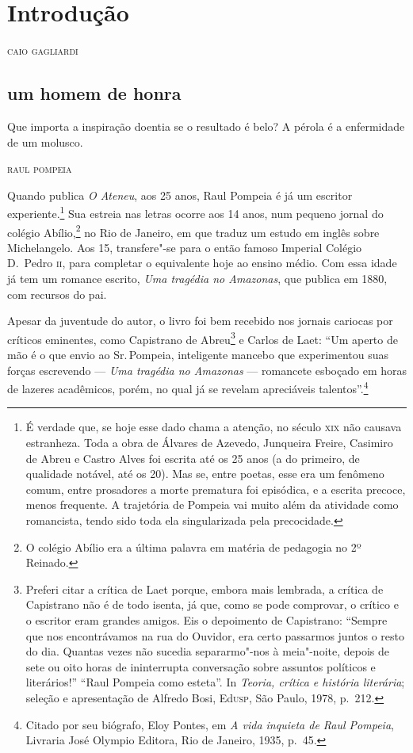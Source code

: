 \chapter[Introdução, \emph{por Caio Gagliardi}]{Introdução}

\begin{flushright}
\textsc{caio gagliardi}
\end{flushright}

\section*{um homem de honra}

\epigraph{Que importa a inspiração doentia se o resultado é belo? A pérola é a enfermidade de um molusco.}{\textsc{raul pompeia}}

Quando publica \textit{O
Ateneu}, aos 25 anos, Raul Pompeia é já um escritor
experiente.\footnote{ É verdade que, se hoje esse dado chama a
atenção, no século \textsc{xix} não causava estranheza. Toda a obra de Álvares
de Azevedo, Junqueira Freire, Casimiro de Abreu e Castro Alves foi
escrita até os 25 anos (a do primeiro, de qualidade notável, até os
20). Mas se, entre poetas, esse era um fenômeno comum, entre prosadores
a morte prematura foi episódica, e a escrita precoce, menos frequente.
A trajetória de Pompeia vai muito além da atividade como romancista,
tendo sido toda ela singularizada pela precocidade.}
Sua estreia nas letras ocorre aos 14 anos, num pequeno jornal do
colégio Abílio,\footnote{O colégio Abílio era a
última palavra em matéria de pedagogia no 2º Reinado.} no Rio de Janeiro, 
em que traduz um estudo em inglês sobre
Michelangelo. Aos 15, transfere"-se para o então famoso Imperial
Colégio D.~Pedro \textsc{ii}, para completar o equivalente hoje ao ensino médio.
Com essa idade já tem um romance escrito, \textit{Uma
tragédia no Amazonas}, que publica em 1880, com recursos do pai.


Apesar da juventude do autor, o livro foi bem recebido
nos jornais cariocas por críticos eminentes, como Capistrano de
Abreu\footnote{ Preferi citar a crítica de Laet porque, embora mais
lembrada, a crítica de Capistrano não é de todo isenta, já que, como se
pode comprovar, o crítico e o escritor eram grandes amigos. Eis o
depoimento de Capistrano: ``Sempre que nos encontrávamos na rua do
Ouvidor, era certo passarmos juntos o resto do dia. Quantas vezes não
sucedia separarmo"-nos à meia"-noite, depois de sete ou oito horas de
ininterrupta conversação sobre assuntos políticos e literários!'' ``Raul
Pompeia como esteta''. In \textit{Teoria, crítica e história literária};
seleção e apresentação de Alfredo Bosi, Ed\textsc{usp}, São Paulo, 1978, p.~212.}
e Carlos de Laet: ``Um aperto de mão é o que envio ao
Sr.\,Pompeia, inteligente mancebo que experimentou suas forças
escrevendo --- \textit{Uma tragédia no
Amazonas} --- romancete esboçado em horas de lazeres
acadêmicos, porém, no qual já se revelam apreciáveis
talentos''.\footnote{ Citado por seu biógrafo, Eloy Pontes, em
\textit{A vida inquieta de Raul Pompeia}, Livraria José
Olympio Editora, Rio de Janeiro, 1935, p.~45.}

